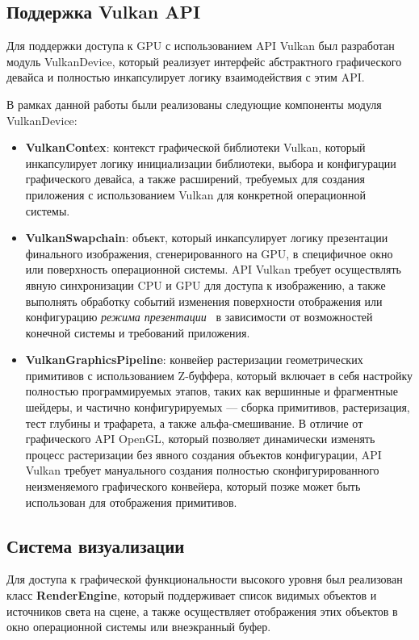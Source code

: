 \documentclass[14pt]{matmex-diploma}
\begin{document}
\subsection{Поддержка Vulkan API}

Для поддержки доступа к GPU с использованием API Vulkan был разработан модуль VulkanDevice, который реализует интерфейс абстрактного графического девайса и полностью инкапсулирует логику взаимодействия с этим API.  

В рамках данной работы были реализованы следующие компоненты модуля VulkanDevice:

\begin{itemize}
    \item \textbf{VulkanContex}: контекст графической библиотеки Vulkan, который инкапсулирует логику инициализации библиотеки, выбора и конфигурации графического девайса, а также расширений, требуемых для создания приложения с использованием Vulkan для конкретной операционной системы. 
    \item \textbf{VulkanSwapchain}: объект, который инкапсулирует логику презентации финального изображения, сгенерированного на GPU, в специфичное окно или поверхность операционной системы. API Vulkan требует осуществлять явную синхронизации CPU и GPU для доступа к изображению, а также выполнять обработку событий изменения поверхности отображения или конфигурацию \textit{режима презентации}~\cite{spec:vulkan} в зависимости от возможностей конечной системы и требований приложения.
    \item \textbf{VulkanGraphicsPipeline}: конвейер растеризации геометрических примитивов с использованием Z-буффера, который включает в себя настройку полностью программируемых этапов, таких как вершинные и фрагментные шейдеры, и частично конфигурируемых --- сборка примитивов, растеризация, тест глубины и трафарета, а также альфа-смешивание. В отличие от графического API OpenGL, который позволяет динамически изменять процесс растеризации без явного создания объектов конфигурации, API Vulkan требует мануального создания полностью сконфигурированного неизменяемого графического конвейера, который позже может быть использован для отображения примитивов.
\end{itemize}

\subsection{Система визуализации}

Для доступа к графической функциональности высокого уровня был реализован класс \textbf{RenderEngine}, который поддерживает список видимых объектов и источников света на сцене, а также осуществляет отображения этих объектов в окно операционной системы или внеэкранный буфер.
\end{document}
